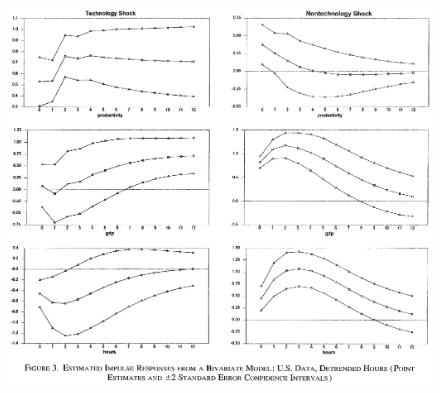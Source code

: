 \documentclass{beamer}
\begin{document}
\begin{frame}
  \begin{figure}
    \includegraphics[scale=.7]{gali.eps}
  \end{figure}
\end{frame}

\end{document}
